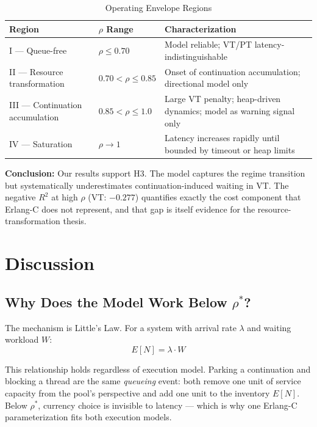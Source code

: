 \documentclass[10pt]{article}
\begin{document}
\begin{table}[t]
\centering
\caption{Operating Envelope Regions}
\label{tab:regions}
\begin{tabular}{@{}lll@{}}
\toprule
\textbf{Region} & \textbf{$\rho$ Range} & \textbf{Characterization} \\
\midrule
I --- Queue-free                  & $\rho \leq 0.70$          & Model reliable; VT/PT latency-indistinguishable \\
II --- Resource transformation    & $0.70 < \rho \leq 0.85$   & Onset of continuation accumulation; directional model only \\
III --- Continuation accumulation & $0.85 < \rho \leq 1.0$    & Large VT penalty; heap-driven dynamics; model as warning signal only \\
IV --- Saturation                 & $\rho \rightarrow 1$      & Latency increases rapidly until bounded by timeout or heap limits \\
\bottomrule
\end{tabular}
\end{table}

\textbf{Conclusion:} Our results support H3. The model captures the regime transition but systematically underestimates continuation-induced waiting in VT. The negative $R^2$ at high $\rho$ (VT: $-0.277$) quantifies exactly the cost component that Erlang-C does not represent, and that gap is itself evidence for the resource-transformation thesis.

\section{Discussion}

\subsection{Why Does the Model Work Below $\rho^*$?}

The mechanism is Little's Law. For a system with arrival rate $\lambda$ and waiting workload $W$:
\begin{equation}
E[N] = \lambda \cdot W
\label{eq:littleslaw}
\end{equation}

This relationship holds regardless of execution model. Parking a continuation and blocking a thread are the same \emph{queueing} event: both remove one unit of service capacity from the pool's perspective and add one unit to the inventory $E[N]$. Below $\rho^*$, currency choice is invisible to latency --- which is why one Erlang-C parameterization fits both execution models.
\end{document}
